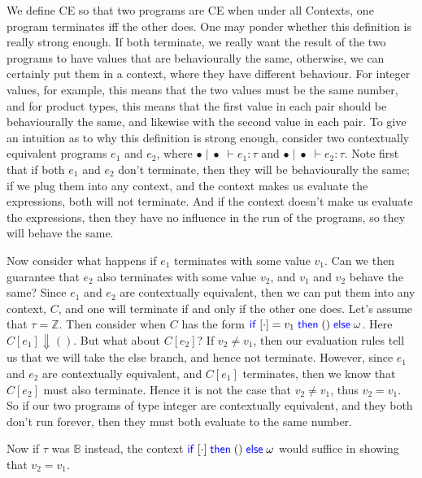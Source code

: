 \documentclass[twoside,11pt,openright]{report}
\theoremstyle{definition}
\newcommand{\Keyword}[1]{{\color{blue} \mathsf{#1}}}
\newcommand{\expr}{e}
\newcommand{\val}{v}
\newcommand{\TT}{()}
\newcommand{\IfCmd}{\Keyword{if}}
\newcommand{\ThenCmd}{\Keyword{then}}
\newcommand{\ElseCmd}{\Keyword{else}}
\def\If#1then#2else#3{\IfCmd{}\;#1\;\ThenCmd{}\;#2\;\ElseCmd{}\;#3}
\newcommand{\empctx}{[\cdot]}
\newcommand{\ctx}{C}
\newcommand{\Tint}{\mathbb{Z}}
\newcommand{\Tbool}{\mathbb{B}}
\newcommand{\typ}{\tau}
\newcommand{\empvenv}{\bullet}
\newcommand{\emptenv}{\bullet}
\newcommand{\jdg}[4]{#1 \; | \; #2 \; \vdash #3 : #4}
\begin{document}
We define CE so that two programs are CE when under all Contexts, one program terminates iff the other does. One may ponder whether this definition is really strong enough. If both terminate, we really want the result of the two programs to have values that are behaviourally the same, otherwise, we can certainly put them in a context, where they have different behaviour.
For integer values, for example, this means that the two values must be the same number, and for product types, this means that the first value in each pair should be behaviourally the same, and likewise with the second value in each pair.
To give an intuition as to  why this definition is strong enough, consider two contextually equivalent programs $\expr_1$ and $\expr_2$, where $\jdg{\emptenv}{\empvenv}{\expr_1}{\typ}$ and $\jdg{\emptenv}{\empvenv}{\expr_2}{\typ}$.
Note first that if both $\expr_1$ and $\expr_2$ don't terminate, then they will be behaviourally the same; if we plug them into any context, and the context makes us evaluate the expressions, both will not terminate. And if the context doesn't make us evaluate the expressions, then they have no influence in the run of the programs, so they will behave the same.

Now consider what happens if $\expr_1$ terminates with some value $\val_1$. Can we then guarantee that $\expr_2$ also terminates with some value $\val_2$, and $\val_1$ and $\val_2$ behave the same? Since $\expr_1$ and $\expr_2$ are contextually equivalent, then we can put them into any context, $\ctx$, and one will terminate if and only if the other one does.
Let's assume that $\typ = \Tint$. Then consider when $\ctx$ has the form $\If \empctx = \val_1 then \TT else \omega$. Here $\ctx[\expr_1] \Downarrow \TT$. But what about $\ctx[\expr_2]$? If $\val_2 \neq \val_1$, then our evaluation rules tell us that we will take the else branch, and hence not terminate. However, since $\expr_1$ and $\expr_2$ are contextually equivalent, and $\ctx[\expr_1]$ terminates, then we know that $\ctx[\expr_2]$ must also terminate. Hence it is not the case that $\val_2 \neq \val_1$, thus $\val_2 = \val_1$. So if our two programs of type integer are contextually equivalent, and they both don't run forever, then they must both evaluate to the same number.

Now if $\typ$ was $\Tbool$ instead, the context $\If \empctx then \TT else \omega$ would suffice in showing that $\val_2 = \val_1$. 
\end{document}

